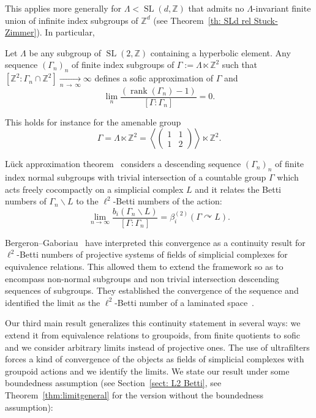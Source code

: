 \documentclass[AHL,Unicode,longabstracts,published]{cedram}
\newcommand{\Zmath}{\mathbb{Z}}
\newcommand{\acting}{\curvearrowright}
\DeclareMathOperator{\rank}{rank}
\DeclareMathOperator{\SL}{SL}
\begin{document}
This applies more generally for $\Lambda<\SL(d,\Zmath)$ that admits no $\Lambda$-invariant finite union of infinite index subgroups of $\Zmath^d$ (see Theorem~\ref{th: SLd rel Stuck-Zimmer}). In particular,
\begin{theo}\label{th: intro SL2 rel Stuck-Zimmer}
Let $\Lambda$ be any subgroup of $\SL(2,\Zmath)$ containing a hyperbolic element. Any sequence $(\Gamma_n)_n$ of finite index subgroups of $\Gamma:=\Lambda\ltimes \Zmath^2$ such that $[\Zmath^2:\Gamma_n\cap \Zmath^2]\underset{n\,\to\,\infty}{\longrightarrow}\infty$ defines a sofic approximation of $\Gamma$ and
\begin{equation}
\lim_{n} \frac{\left(\rank (\Gamma_n)-1\right)}{ [\Gamma:\Gamma_n]}=0.
\end{equation}
\end{theo}

This holds for instance for the amenable group
\[
\Gamma=\Lambda\ltimes \Zmath^2=\left\langle
\begin{pmatrix} 1 & 1 \\ 1 & 2
\end{pmatrix} \right \rangle \ltimes \Zmath^2.
\]



L\"uck approximation theorem~\cite{Luc94b} considers a descending sequence $(\Gamma_n)_n$ of finite index normal subgroups with trivial intersection of a countable group $\Gamma$ which acts freely cocompactly on a simplicial complex $L$ and it relates the Betti numbers of $\Gamma_n\backslash L$ to the $\ell^2$-Betti numbers of the action:
\begin{equation}
\lim_{n\to \infty} \frac{b_i(\Gamma_n\backslash L)}{[\Gamma:\Gamma_n]}=\beta^{(2)}_{i}(\Gamma\acting L).
\end{equation}



Bergeron--Gaboriau~\cite{berggab} have interpreted this convergence as a continuity result for $\ell^2$-Betti numbers of projective systems of fields of simplicial complexes for equivalence relations. This allowed them to extend the framework so as to encompass non-normal subgroups and non trivial intersection descending sequences of subgroups. They established the convergence of the sequence and identified the limit as the $\ell^2$-Betti number of a laminated space~\cite[Théorème~0.2, Théorème~3.1]{berggab}.

Our third main result generalizes this continuity statement in several ways: we extend it from equivalence relations to groupoids, from finite quotients to sofic and we consider arbitrary limits instead of projective ones. The use of ultrafilters forces a kind of convergence of the objects as fields of simplicial complexes with groupoid actions and we identify the limits. We state our result under some boundedness assumption (see Section~\ref{sect: L2 Betti}, see Theorem~\ref{thm:limitgeneral} for the version without the boundedness assumption):
\end{document}
